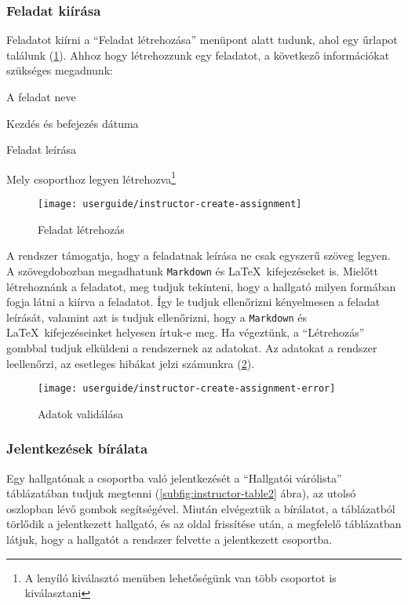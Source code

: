 \subsubsection{Feladat kiírása}
\label{step:instructor-create-assignment}
Feladatot kiírni a ``Feladat létrehozása'' menüpont alatt tudunk, ahol egy űrlapot találunk (\ref{fig:instructor-create-assignment}). Ahhoz hogy létrehozzunk egy feladatot, a következő információkat szükséges megadnunk:
\begin{compactitem}
    \item A feladat neve
    \item Kezdés és befejezés dátuma
	\item Feladat leírása
	\item Mely csoporthoz legyen létrehozva\footnote{A lenyíló kiválasztó menüben lehetőségünk van több csoportot is kiválasztani}
\end{compactitem}
\begin{figure}[H]
	\centering
	\texttt{[image: userguide/instructor-create-assignment]}
	\caption{Feladat létrehozás}
	\label{fig:instructor-create-assignment}
\end{figure}
A rendszer támogatja, hogy a feladatnak leírása ne csak egyszerű szöveg legyen. A szövegdobozban megadhatunk \texttt{Markdown} és \LaTeX\ kifejezéseket is. Mielőtt létrehoznánk a feladatot, meg tudjuk tekinteni, hogy a hallgató milyen formában fogja látni a kiírva a feladatot. Így le tudjuk ellenőrizni kényelmesen a feladat leírását, valamint azt is tudjuk ellenőrizni, hogy a \texttt{Markdown} és \LaTeX\ kifejezéseinket helyesen írtuk-e meg. Ha végeztünk, a ``Létrehozás'' gombbal tudjuk elküldeni a rendszernek az adatokat. Az adatokat a rendszer leellenőrzi, az esetleges hibákat jelzi számunkra (\ref{fig:instructor-create-assignment-error}).
\begin{figure}[H]
	\centering
	\texttt{[image: userguide/instructor-create-assignment-error]}
	\caption{Adatok validálása}
	\label{fig:instructor-create-assignment-error}
\end{figure}
\subsubsection{Jelentkezések bírálata}
\label{step:instructor-pending}
Egy hallgatónak a csoportba való jelentkezését a ``Hallgatói várólista'' táblázatában tudjuk megtenni (\ref{subfig:instructor-table2} ábra), az utolsó oszlopban lévő gombok segítségével. Miután elvégeztük a bírálatot, a táblázatból törlődik a jelentkezett hallgató, és az oldal frissítése után, a megfelelő táblázatban látjuk, hogy a hallgatót a rendszer felvette a jelentkezett csoportba.
